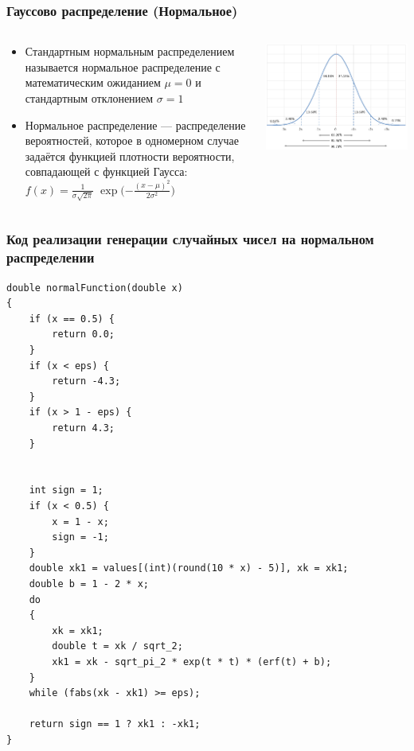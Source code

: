 \documentclass{beamer}
\begin{document}
\begin{frame}
\frametitle{Гауссово распределение (Нормальное)}
\begin{columns}[T,onlytextwidth]
\begin{column}{0.5\textwidth}
\small
\begin{itemize}
\item
Стандартным нормальным распределением называется нормальное распределение с математическим ожиданием $\mu = 0$ и стандартным отклонением $\sigma = 1$
\item
Нормальное распределение --- распределение вероятностей, которое в одномерном случае задаётся функцией плотности вероятности, совпадающей с функцией Гаусса:
$ f(x)={\frac {1}{\sigma {\sqrt {2\pi }}}}\;\exp {\biggl (}{-{\frac {(x-\mu )^{2}}{2\sigma ^{2}}}}{\biggr )} $
\end{itemize}
\end{column}
\begin{column}{0.5\textwidth}
\includegraphics[width=\textwidth]{20-5-Normal-distribution.png}
\end{column}
\end{columns}
\end{frame}


\begin{frame}[fragile]
\frametitle{Код реализации генерации случайных чисел на нормальном распределении}
\tiny
\begin{verbatim}
double normalFunction(double x)
{
    if (x == 0.5) {
        return 0.0;
    }
    if (x < eps) {
        return -4.3;
    }
    if (x > 1 - eps) {
        return 4.3;
    }


    int sign = 1;
    if (x < 0.5) {
        x = 1 - x;
        sign = -1;
    }
    double xk1 = values[(int)(round(10 * x) - 5)], xk = xk1;
    double b = 1 - 2 * x;
    do 
    {
        xk = xk1;
        double t = xk / sqrt_2;
        xk1 = xk - sqrt_pi_2 * exp(t * t) * (erf(t) + b);
    } 
    while (fabs(xk - xk1) >= eps);

    return sign == 1 ? xk1 : -xk1;
}
\end{verbatim}
\end{frame}
\end{document}

